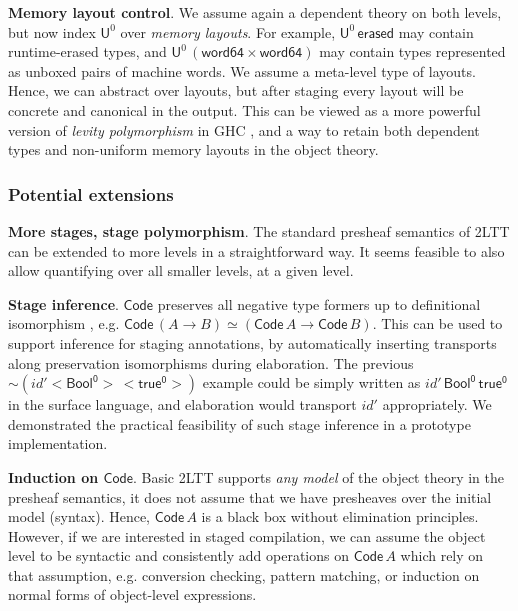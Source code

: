 \documentclass{easychair}
\newcommand{\U}{\mathsf{U}}
\newcommand{\Code}{\mathsf{Code}}
\begin{document}
\textbf{Memory layout control}. We assume again a dependent theory on both
levels, but now index $\U^0$ over \emph{memory layouts}. For example,
$\U^0\,\mathsf{erased}$ may contain runtime-erased types, and
$\U^0\,(\mathsf{word64} \times \mathsf{word64})$ may contain types represented
as unboxed pairs of machine words. We assume a meta-level type of
layouts. Hence, we can abstract over layouts, but after staging every layout
will be concrete and canonical in the output. This can be viewed as a more
powerful version of \emph{levity polymorphism} in GHC \cite{levity}, and a way
to retain both dependent types and non-uniform memory layouts in the object
theory.

\subsubsection*{Potential extensions}

\textbf{More stages, stage polymorphism}. The standard presheaf semantics of
2LTT can be extended to more levels in a straightforward way. It seems feasible
to also allow quantifying over all smaller levels, at a given level.

\textbf{Stage inference}. $\Code$ preserves all negative type formers up to
definitional isomorphism \cite{twolevel}, e.g. $\Code\,(A \to B) \simeq
(\Code\,A \to \Code\,B)$. This can be used to support inference for staging
annotations, by automatically inserting transports along preservation
isomorphisms during elaboration. The previous
$\sim\!(\mathit{id'}<\!\mathsf{Bool^0}\!>\,<\!\mathsf{true^0}\!>)$ example could
be simply written as $\mathit{id'}\,\mathsf{Bool^0}\,\mathsf{true^0}$ in the
surface language, and elaboration would transport $\mathit{id'}$ appropriately.
We demonstrated the practical feasibility of such stage inference in a prototype
implementation.

\textbf{Induction on $\Code$}. Basic 2LTT supports \emph{any model} of the
object theory in the presheaf semantics, it does not assume that we have
presheaves over the initial model (syntax). Hence, $\Code\,A$ is a black box
without elimination principles. However, if we are interested in staged
compilation, we can assume the object level to be syntactic and consistently add
operations on $\Code\,A$ which rely on that assumption, e.g. conversion
checking, pattern matching, or induction on normal forms of object-level
expressions.



\end{document}
